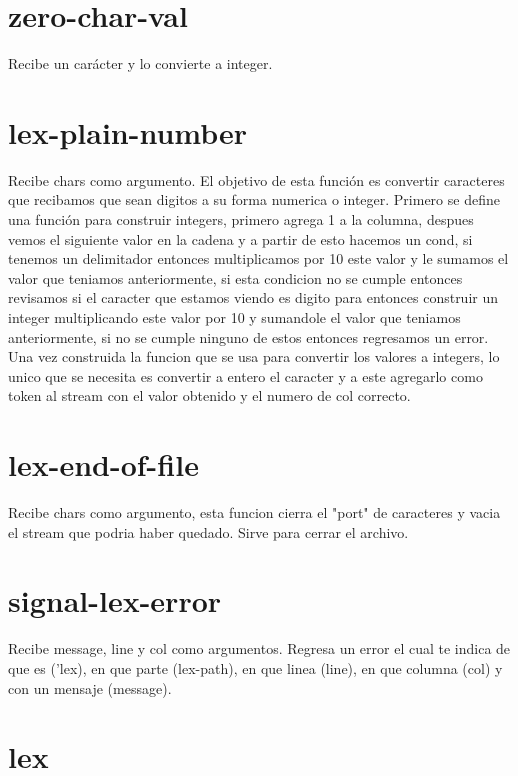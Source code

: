 \documentclass{article}
\begin{document}
\section{zero-char-val}

Recibe un carácter y lo convierte a integer.

\section{lex-plain-number}

Recibe chars como argumento. El objetivo de esta función es convertir caracteres que recibamos que sean digitos a su forma numerica o integer. Primero se define una función para construir integers, primero agrega 1 a la columna, despues vemos el siguiente valor en la cadena y a partir de esto hacemos un cond, si tenemos un delimitador entonces multiplicamos por 10 este valor y le sumamos el valor que teniamos anteriormente, si esta condicion no se cumple entonces revisamos si el caracter que estamos viendo es digito para entonces construir un integer multiplicando este valor por 10 y sumandole el valor que teniamos anteriormente, si no se cumple ninguno de estos entonces regresamos un error.
Una vez construida la funcion que se usa para convertir los valores a integers, lo unico que se necesita es convertir a entero el caracter y a este agregarlo como token al stream con el valor obtenido y el numero de col correcto.

\section{lex-end-of-file}

Recibe chars como argumento, esta funcion cierra el "port" de caracteres y vacia el stream que podria haber quedado. Sirve para cerrar el archivo.

\section{signal-lex-error}

Recibe message, line y col como argumentos. Regresa un error el cual te indica de que es ('lex), en que parte (lex-path), en que linea (line), en que columna (col) y con un mensaje (message).

\section{lex}
\end{document}
